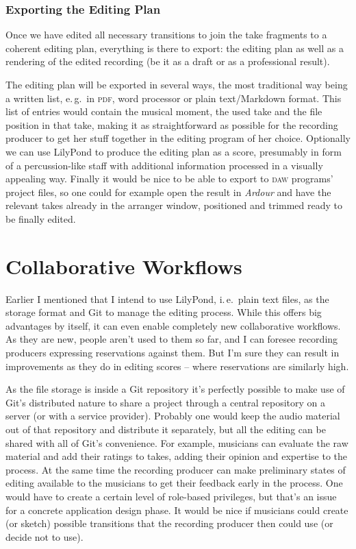 \documentclass[11pt,a4paper]{article}
\begin{document}
\subsubsection{Exporting the Editing Plan}

Once we have edited all necessary transitions to join the take fragments to a
coherent editing plan, everything is there to export: the editing plan as well as
a rendering of the edited recording (be it as a draft or as a professional
result).

The editing plan will be exported in several ways, the most traditional way
being a written list, e.\,g.\ in \textsc{pdf}, word processor or plain text/Markdown
format.
This list of entries would contain the musical moment, the used take and the file
position in that take, making it as straightforward as possible for the
recording producer to get her stuff together in the editing program of her
choice.
Optionally we can use LilyPond to produce the editing plan as a score,
presumably in form of a percussion-like staff with additional information
processed in a visually appealing way.
Finally it would be nice to be able to export to \textsc{daw} programs' project
files, so one could for example open the result in \emph{Ardour} and have the relevant
takes already in the arranger window, positioned and trimmed ready to be finally
edited.

\section{Collaborative Workflows}

Earlier I mentioned that I intend to use LilyPond, i.\,e.\ plain text files, as
the storage format and Git to manage the editing process.
While this offers big advantages by itself, it can even enable completely new
collaborative workflows.
As they are new, people aren't used to them so far, and I can foresee recording
producers expressing reservations against them.
But I'm sure they can result in improvements as they do in editing scores -- where
reservations are similarly high.

As the file storage is inside a Git repository it's perfectly possible to make
use of Git's distributed nature to share a project through a central repository
on a server (or with a service provider).
Probably one would keep the audio material out of that repository and distribute
it separately, but all the editing can be shared with all of Git's convenience.
For example, musicians can evaluate the raw material and add their ratings to
takes, adding their opinion and expertise to the process.
At the same time the recording producer can make preliminary states of editing
available to the musicians to get their feedback early in the process.
One would have to create a certain level of role-based privileges, but that's an
issue for a concrete application design phase.
It would be nice if musicians could create (or sketch) possible transitions that
the recording producer then could use (or decide not to use).
\end{document}
